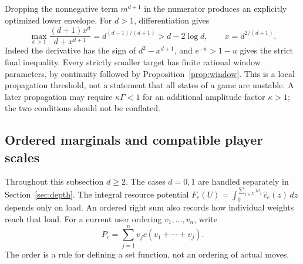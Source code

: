 \documentclass[manuscript,review,anonymous]{acmart}
\begin{document}
Dropping the nonnegative term $m^{d+1}$ in the numerator produces an explicitly optimized lower envelope. For $d>1$, differentiation gives
\begin{equation}\label{eq:localopt}
 \max_{x>1}\frac{(d+1)x^d}{d+x^{d+1}}
 =d^{(d-1)/(d+1)}>d-2\log d,
 \qquad x=d^{2/(d+1)}.
\end{equation}
Indeed the derivative has the sign of $d^2-x^{d+1}$, and $e^{-u}>1-u$ gives the strict final inequality. Every strictly smaller target has finite rational window parameters, by continuity followed by Proposition~\ref{prop:window}. This is a local propagation threshold, not a statement that all states of a game are unstable. A later propagation may require $\kappa\Gamma<1$ for an additional amplitude factor $\kappa>1$; the two conditions should not be conflated.

\subsection{Ordered marginals and compatible player scales}\label{sec:scales}
Throughout this subsection $d\ge2$. The cases $d=0,1$ are handled separately in Section~\ref{sec:depth}. The integral resource potential $F_e(U)=\int_0^{\sum_{j\in U}w_j}\widehat c_e(z)\,dz$ depends only on load. An ordered right sum also records how individual weights reach that load. For a current user ordering $v_1,\ldots,v_n$, write
\begin{equation}\label{eq:orderedsum}
 P_c=\sum_{j=1}^nv_jc(v_1+\cdots+v_j).
\end{equation}
The order is a rule for defining a set function, not an ordering of actual moves.
\end{document}
